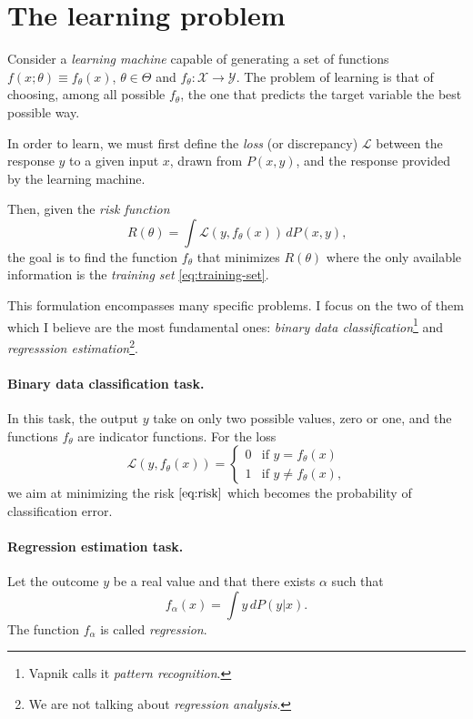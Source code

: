 \section{The learning problem}

Consider a \emph{learning machine} capable of generating a set of functions $f(x;
\theta) \equiv f_\theta(x)$, $\theta \in \Theta$ and $f_\theta : \mathcal{X} \rightarrow \mathcal{Y}$.
The problem of learning is that of choosing, among all possible $f_\theta$, the one that
predicts the target variable the best possible way.

In order to learn, we must first define the \emph{loss} (or discrepancy) $\mathcal{L}$
between the response $y$ to a given input $x$, drawn from $P(x, y)$, and the
response provided by the learning machine.

Then, given the \emph{risk function}
\begin{equation}
  \label{eq:risk}
  R(\theta) = \int \mathcal{L}(y, f_\theta(x))\, dP(x, y)\text{,}
\end{equation}
the goal is to find the function $f_\theta$ that minimizes $R(\theta)$
where the only available information is the \emph{training set} \eqref{eq:training-set}.

This formulation encompasses many specific problems. I focus on the two of them which I
believe are the most fundamental ones: \emph{binary data classification}\footnote{Vapnik
calls it \emph{pattern recognition}.} and \emph{regresssion estimation}\footnote{We are not talking about
\emph{regression analysis}.}.

\paragraph{Binary data classification task.}  In this task, the output $y$ take on
only two possible values, zero or one, and the functions $f_\theta$ are indicator
functions. For the loss
\begin{equation*}
  \mathcal{L}(y, f_\theta(x)) = \begin{cases}
    0 & \text{if } y = f_\theta(x) \\
    1 & \text{if } y \neq f_\theta(x)\text{,}
  \end{cases}
\end{equation*}
we aim at minimizing the risk $\eqref{eq:risk}$ which becomes the probability of
classification error.

\paragraph{Regression estimation task.} Let the outcome $y$ be a real value and that there exists
$\alpha$ such that $$f_\alpha(x) = \int y\, dP(y|x) \text{.}$$  The function $f_\alpha$ is
called \emph{regression}.
